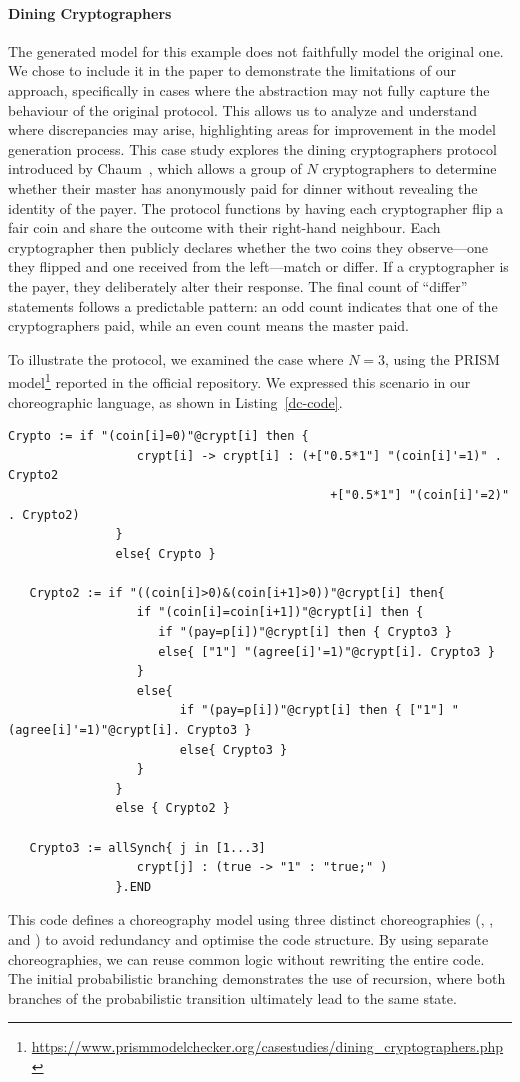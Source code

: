 \paragraph{Dining Cryptographers}
The generated model for this example does not faithfully model the original one. We chose 
to include it in the paper to demonstrate the limitations of our approach, 
specifically in cases where the abstraction may not fully capture the behaviour of the original protocol. 
This allows us to analyze and understand where discrepancies may arise, 
highlighting areas for improvement in the model generation process.
This case study explores the dining cryptographers protocol introduced by Chaum~\cite{Cha88}, which allows a group of $N$ cryptographers to determine whether their master has anonymously paid for dinner without revealing the identity of the payer. The protocol functions by having each cryptographer flip a fair coin and share the outcome with their right-hand neighbour. Each cryptographer then publicly declares whether the two coins they observe—one they flipped and one received from the left—match or differ. If a cryptographer is the payer, they deliberately alter their response. The final count of ``differ'' statements follows a predictable pattern: an odd count indicates that one of the cryptographers paid, while an even count means the master paid.


To illustrate the protocol, we examined the case where $N=3$, using the PRISM model\footnote{\url{https://www.prismmodelchecker.org/casestudies/dining_cryptographers.php}} reported in the official repository. We expressed this scenario in our choreographic language, as shown in Listing~\ref{dc-code}.
\begin{lstlisting}[style=chor-color,caption={Choreography for the Dining Cryptographers Protocol},captionpos=b,label={dc-code}]
   Crypto := if "(coin[i]=0)"@crypt[i] then {
                  crypt[i] -> crypt[i] : (+["0.5*1"] "(coin[i]'=1)" . Crypto2
                                             +["0.5*1"] "(coin[i]'=2)" . Crypto2) 
               }
               else{ Crypto }

   Crypto2 := if "((coin[i]>0)&(coin[i+1]>0))"@crypt[i] then{
                  if "(coin[i]=coin[i+1])"@crypt[i] then {
                     if "(pay=p[i])"@crypt[i] then { Crypto3 }
                     else{ ["1"] "(agree[i]'=1)"@crypt[i]. Crypto3 }
                  }
                  else{
                        if "(pay=p[i])"@crypt[i] then { ["1"] "(agree[i]'=1)"@crypt[i]. Crypto3 }
                        else{ Crypto3 }
                  }
               }
               else { Crypto2 }

   Crypto3 := allSynch{ j in [1...3]
                  crypt[j] : (true -> "1" : "true;" )
               }.END
\end{lstlisting}
This code defines a choreography model using three distinct choreographies (, , and ) to avoid redundancy and optimise the code structure. By using separate choreographies, we can reuse common logic without rewriting the entire code.
The initial probabilistic branching demonstrates the use of recursion, where both branches of the probabilistic transition ultimately lead to the same state. 

